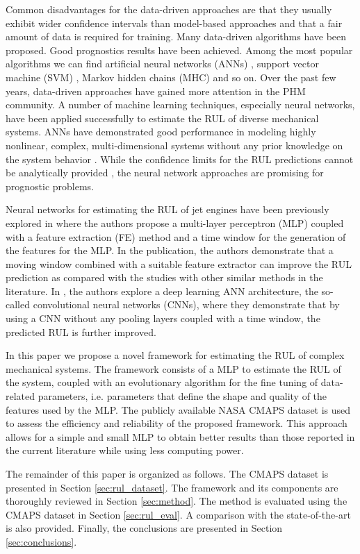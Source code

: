 \documentclass[preprint,12pt]{elsarticle}%
\begin{document}
Common disadvantages for the data-driven approaches are that they usually
exhibit wider confidence intervals than model-based approaches and that a fair
amount of data is required for training. Many data-driven algorithms have been
proposed. Good prognostics results have been achieved. Among the most popular
algorithms we can find artificial neural networks (ANNs) \cite{Gebraeel2004},
support vector machine (SVM) \cite{Benkedjouh2013}, Markov hidden chains (MHC)
\cite{Dong2007} and so on. Over the past few years, data-driven approaches
have gained more attention in the PHM community. A number of machine learning
techniques, especially neural networks, have been applied successfully to
estimate the RUL of diverse mechanical systems. ANNs have demonstrated good
performance in modeling highly nonlinear, complex, multi-dimensional systems
without any prior knowledge on the system behavior \cite{Li2018}. While the
confidence limits for the RUL predictions cannot be analytically provided
\cite{Sikorska2011}, the neural network approaches are promising for
prognostic problems.

Neural networks for estimating the RUL of jet engines have been previously
explored in \cite{Lim2016} where the authors propose a multi-layer perceptron
(MLP) coupled with a feature extraction (FE) method and a time window for the
generation of the features for the MLP. In the publication, the authors
demonstrate that a moving window combined with a suitable feature extractor
can improve the RUL prediction as compared with the studies with other similar
methods in the literature. In \cite{Li2018}, the authors explore a deep
learning ANN architecture, the so-called convolutional neural networks (CNNs),
where they demonstrate that by using a CNN without any pooling layers coupled
with a time window, the predicted RUL is further improved.

In this paper we propose a novel framework for estimating the RUL of complex
mechanical systems. The framework consists of a MLP to estimate the RUL of the
system, coupled with an evolutionary algorithm for the fine tuning of
data-related parameters, i.e. parameters that define the shape and quality of
the features used by the MLP. The publicly available NASA CMAPS dataset
\cite{CMAPS2008} is used to assess the efficiency and reliability of the
proposed framework. This approach allows for a simple and small MLP to obtain
better results than those reported in the current literature while using less
computing power.

The remainder of this paper is organized as follows. The CMAPS dataset is
presented in Section \ref{sec:rul_dataset}. The framework and its components
are thoroughly reviewed in Section \ref{sec:method}. The method is evaluated
using the CMAPS dataset in Section \ref{sec:rul_eval}. A comparison with the
state-of-the-art is also provided. Finally, the conclusions are presented in
Section \ref{sec:conclusions}.
\end{document}
